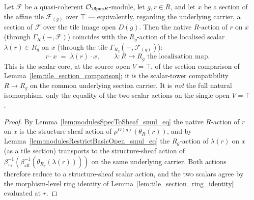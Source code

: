 \begin{lemma}\leanok
  \label{lem:tile_scalar_compat}
  Let \(\mathcal{F}\) be a quasi-coherent \(\mathcal{O}_{\Spec R}\)-module, let \(g, r \in R\), and let
  \(x\) be a section of the affine tile \(\mathcal{F}_{(g)}\) over \(\top\) --- equivalently, regarding
  the underlying carrier, a section of \(\mathcal{F}\) over the tile image open \(D(g)\). Then the native
  \(R\)-action of \(r\) on \(x\) (through \(\Gamma_R(-,\mathcal{F})\)) coincides with the \(R_g\)-action
  of the localised scalar \(\lambda(r) \in R_g\) on \(x\) (through the tile
  \(\Gamma_{R_g}(-, \mathcal{F}_{(g)})\)):
  \[
    r \cdot x \;=\; \lambda(r) \cdot x,
    \qquad \lambda : R \to R_g \text{ the localisation map}.
  \]
  This is the scalar core, at the source open \(V = \top\), of the section comparison of
  Lemma~\ref{lem:tile_section_comparison}; it is the scalar-tower compatibility \(R \to R_g\) on the
  common underlying section carrier. It is \emph{not} the full natural isomorphism, only the equality of
  the two scalar actions on the single open \(V = \top\).
\end{lemma}
\begin{proof}
    \leanok
  By Lemma~\ref{lem:modulesSpecToSheaf_smul_eq} the native \(R\)-action of \(r\) on \(x\) is the
  structure-sheaf action of \(\rho^{D(g)}(\theta_R(r))\), and by
  Lemma~\ref{lem:modulesRestrictBasicOpen_smul_eq} the \(R_g\)-action of \(\lambda(r)\) on \(x\) (as a
  tile section) transports to the structure-sheaf action of
  \(\beta_{\hookrightarrow}^{-1}(\beta_{\mathrm{aff}}^{-1}(\theta_{R_g}(\lambda(r))))\) on the same
  underlying carrier. Both actions therefore reduce to a structure-sheaf scalar action, and the two
  scalars agree by the morphism-level ring identity of Lemma~\ref{lem:tile_section_ring_identity}
  evaluated at \(r\).
\end{proof}


